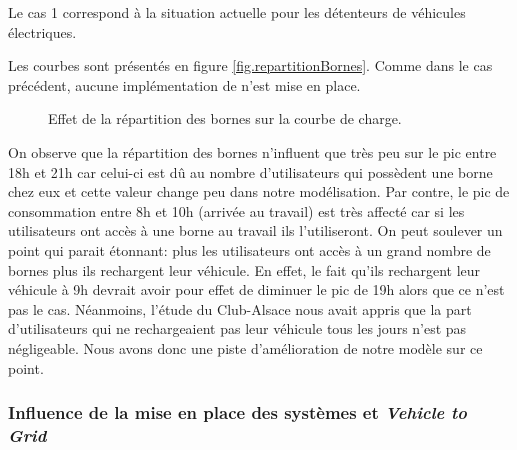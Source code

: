 				Le cas 1 correspond à la situation actuelle pour les détenteurs de véhicules électriques.
				
				Les courbes sont présentés en figure \vref{fig.repartitionBornes}. Comme dans le cas précédent, aucune implémentation de \smartgrid{} n'est mise en place.
				
				\begin{figure}[!h]
					\centering
					\caption{Effet de la répartition des bornes sur la courbe de charge. \label{fig.repartitionBornes}}
				\end{figure}
				On observe que la répartition des bornes n’influent que très peu sur le pic entre 18h et 21h car celui-ci est dû au nombre d’utilisateurs qui possèdent une borne chez eux et cette valeur change peu dans notre modélisation. Par contre, le pic de consommation entre 8h et 10h (arrivée au travail) est très affecté car si les utilisateurs ont accès à une borne au travail ils l’utiliseront. On peut soulever un point qui parait étonnant: plus les utilisateurs ont accès à un grand nombre de bornes plus ils rechargent leur véhicule. En effet, le fait qu’ils rechargent leur véhicule à 9h devrait avoir pour effet de diminuer le pic de 19h alors que ce n’est pas le cas. Néanmoins, l'étude du Club-Alsace nous avait appris que la part d'utilisateurs qui ne rechargeaient pas leur véhicule tous les jours n'est pas négligeable. Nous avons donc une piste d'amélioration de notre modèle sur ce point.
				
				
				\subsubsection{Influence de la mise en place des systèmes \smartgrid{} et \emph{Vehicle to Grid}}
				
